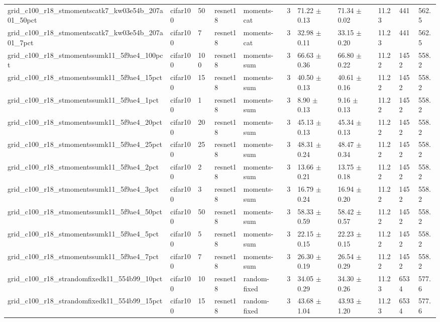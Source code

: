 \begin{tabular}{lllllllllll}
grid_c100_r18_stmomentscatk7_kw03e54b_207a01_50pct & cifar100 & 50 & resnet18 & moments-cat & 3 & 71.22 $\pm$ 0.13 & 71.34 $\pm$ 0.02 & 11.23 & 441 & 562.5 \\
grid_c100_r18_stmomentscatk7_kw03e54b_207a01_7pct & cifar100 & 7 & resnet18 & moments-cat & 3 & 32.98 $\pm$ 0.11 & 33.15 $\pm$ 0.20 & 11.23 & 441 & 562.5 \\
grid_c100_r18_stmomentssumk11_5f9ae4_100pct & cifar100 & 100 & resnet18 & moments-sum & 3 & 66.63 $\pm$ 0.36 & 66.80 $\pm$ 0.22 & 11.22 & 1452 & 558.2 \\
grid_c100_r18_stmomentssumk11_5f9ae4_15pct & cifar100 & 15 & resnet18 & moments-sum & 3 & 40.50 $\pm$ 0.13 & 40.61 $\pm$ 0.16 & 11.22 & 1452 & 558.2 \\
grid_c100_r18_stmomentssumk11_5f9ae4_1pct & cifar100 & 1 & resnet18 & moments-sum & 3 & 8.90 $\pm$ 0.13 & 9.16 $\pm$ 0.13 & 11.22 & 1452 & 558.2 \\
grid_c100_r18_stmomentssumk11_5f9ae4_20pct & cifar100 & 20 & resnet18 & moments-sum & 3 & 45.13 $\pm$ 0.13 & 45.34 $\pm$ 0.13 & 11.22 & 1452 & 558.2 \\
grid_c100_r18_stmomentssumk11_5f9ae4_25pct & cifar100 & 25 & resnet18 & moments-sum & 3 & 48.31 $\pm$ 0.24 & 48.47 $\pm$ 0.34 & 11.22 & 1452 & 558.2 \\
grid_c100_r18_stmomentssumk11_5f9ae4_2pct & cifar100 & 2 & resnet18 & moments-sum & 3 & 13.66 $\pm$ 0.21 & 13.75 $\pm$ 0.18 & 11.22 & 1452 & 558.2 \\
grid_c100_r18_stmomentssumk11_5f9ae4_3pct & cifar100 & 3 & resnet18 & moments-sum & 3 & 16.79 $\pm$ 0.24 & 16.94 $\pm$ 0.20 & 11.22 & 1452 & 558.2 \\
grid_c100_r18_stmomentssumk11_5f9ae4_50pct & cifar100 & 50 & resnet18 & moments-sum & 3 & 58.33 $\pm$ 0.59 & 58.42 $\pm$ 0.57 & 11.22 & 1452 & 558.2 \\
grid_c100_r18_stmomentssumk11_5f9ae4_5pct & cifar100 & 5 & resnet18 & moments-sum & 3 & 22.15 $\pm$ 0.15 & 22.23 $\pm$ 0.15 & 11.22 & 1452 & 558.2 \\
grid_c100_r18_stmomentssumk11_5f9ae4_7pct & cifar100 & 7 & resnet18 & moments-sum & 3 & 26.30 $\pm$ 0.19 & 26.54 $\pm$ 0.29 & 11.22 & 1452 & 558.2 \\
grid_c100_r18_strandomfixedk11_554b99_10pct & cifar100 & 10 & resnet18 & random-fixed & 3 & 34.05 $\pm$ 0.29 & 34.30 $\pm$ 0.26 & 11.23 & 6534 & 577.6 \\
grid_c100_r18_strandomfixedk11_554b99_15pct & cifar100 & 15 & resnet18 & random-fixed & 3 & 43.68 $\pm$ 1.04 & 43.93 $\pm$ 1.20 & 11.23 & 6534 & 577.6 \\

\end{tabular}
